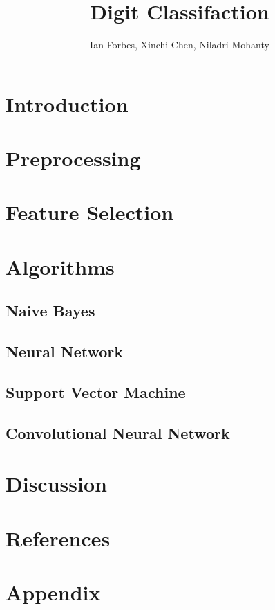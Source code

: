 \documentclass[10pt,twocolumn]{article}
\title{Digit Classifaction}
\author{Ian Forbes, Xinchi Chen, Niladri Mohanty}
\begin{document}
\section{Introduction}
\section{Preprocessing}
\section{Feature Selection}
\section{Algorithms}
\subsection{Naive Bayes}
\subsection{Neural Network}
\subsection{Support Vector Machine}
\subsection{Convolutional Neural Network}
\section{Discussion}
\section{References}
\section{Appendix}
\end{document}
